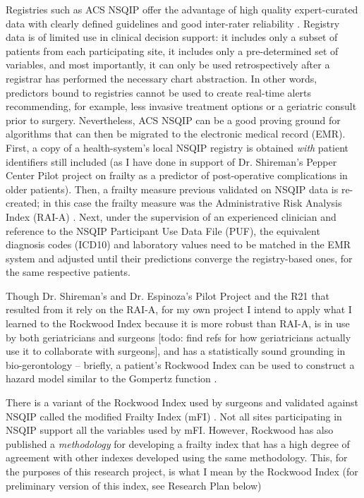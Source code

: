 Registries such as ACS NSQIP offer the advantage of high quality expert-curated data with clearly defined guidelines and good inter-rater reliability \cite{Shiloach_2010}. Registry data is of limited use in clinical decision support: it includes only a subset of patients from each participating site, it includes only a pre-determined set of variables, and most importantly, it can only be used retrospectively after a registrar has performed the necessary chart abstraction. In other words, predictors bound to registries cannot be used to create real-time alerts recommending, for example, less invasive treatment options or a geriatric consult prior to surgery. Nevertheless, ACS NSQIP can be a good proving ground for algorithms that can then be migrated to the electronic medical record (EMR). First, a copy of a health-system's local NSQIP registry is obtained \textit{with} patient identifiers still included (as I have done in support of Dr. Shireman's Pepper Center Pilot project on frailty as a predictor of post-operative complications in older patients). Then, a frailty measure previous validated on NSQIP data is re-created; in this case the frailty measure was the Administrative Risk Analysis Index (RAI-A) \cite{Hall_2017,Johnson_2014,Melin_2015,Gupta_2011}. Next, under the supervision of an experienced clinician and reference to the NSQIP Participant Use Data File (PUF), the equivalent diagnosis codes (ICD10) and laboratory values need to be matched in the EMR system and adjusted until their predictions converge the registry-based ones, for the same respective patients.

Though Dr. Shireman's and Dr. Espinoza's Pilot Project and the R21 that resulted from it rely on the RAI-A, for my own project I intend to apply what I learned to the Rockwood Index because it is more robust than RAI-A, is in use by both geriatricians and surgeons [todo: find refs for how geriatricians actually use it to collaborate with surgeons], and has a statistically sound grounding in bio-gerontology -- briefly, a patient's Rockwood Index can be used to construct a hazard model  \cite{Mitnitski_2001} similar to the Gompertz function \cite{Mueller_1995,Pletcher_2000,Bokov_2017}.

There is a variant of the Rockwood Index used by surgeons and validated against NSQIP called the modified Frailty Index (mFI) \cite{Uppal_2015,Tsiouris_2013,Bellamy_2017,22491599,23711971,23949353}. Not all sites participating in NSQIP support all the variables used by mFI. However, Rockwood has also published a \textit{methodology} for developing a frailty index that has a high degree of agreement with other indexes developed using the same methodology. This, for the purposes of this research project, is what I mean by the Rockwood Index (for preliminary version of this index, see Research Plan below)

